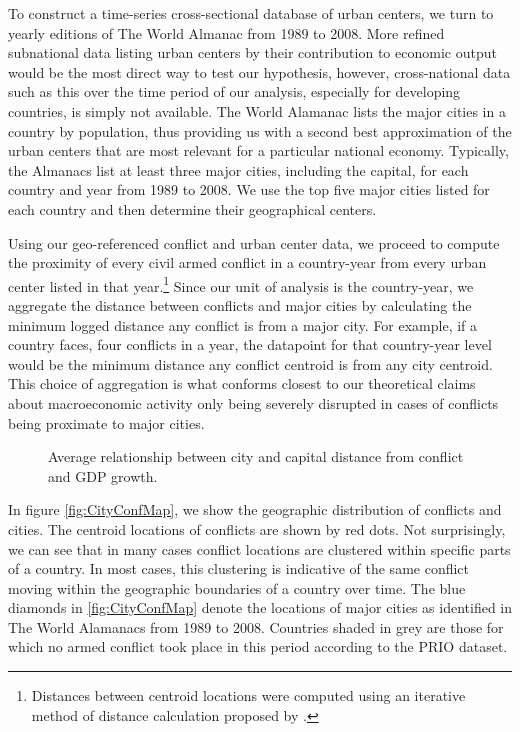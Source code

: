 To construct a time-series cross-sectional database of urban centers, we turn to yearly editions of The World Almanac from 1989 to 2008. More refined subnational data listing urban centers by their contribution to economic output would be the most direct way to test our hypothesis, however, cross-national data such as this over the time period of our analysis, especially for developing countries, is simply not available. The World Alamanac lists the major cities in a country by population, thus providing us with a second best approximation of the urban centers that are most relevant for a particular national economy. Typically, the Almanacs list at least three major cities, including the capital, for each country and year from 1989 to 2008. We use the top five major cities listed for each country and then determine their geographical centers.


Using our geo-referenced conflict and urban center data, we proceed to compute the proximity of every civil armed conflict in a country-year from every urban center listed in that year.\footnote{Distances between centroid locations were computed using an iterative method of distance calculation proposed by \citet{vincenty:1975}.} Since our unit of analysis is the country-year, we aggregate the distance between conflicts and major cities by calculating the  minimum logged distance any conflict is from a major city. For example, if a country faces, four conflicts in a year, the datapoint for that country-year level would be the minimum distance any conflict centroid is from any city centroid. This choice of aggregation is what conforms closest to our theoretical claims about macroeconomic activity only being severely disrupted in cases of conflicts being proximate to major cities. 

\begin{figure}
	\centering
	\resizebox{.8\textwidth}{!}{}
	\caption{Average relationship between city and capital distance from conflict and GDP growth.}
	\label{fig:distGdp}
\end{figure}

In figure \ref{fig:CityConfMap}, we show the geographic distribution of conflicts and cities. The centroid locations of conflicts are shown by red dots. Not surprisingly, we can see that in many cases conflict locations are clustered within specific parts of a country. In most cases, this clustering is indicative of the same conflict moving within the geographic boundaries of a country over time. The blue diamonds in \ref{fig:CityConfMap} denote the locations of major cities as identified in The World Alamanacs from 1989 to 2008. Countries shaded in grey are those for which no armed conflict took place in this period according to the PRIO dataset.  

